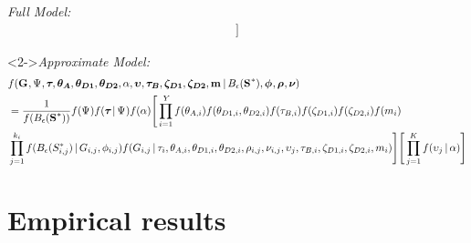 \begin{frame}[b]
\begin{onlyenv}
\begin{block}{\it Full Model:}
{\begin{equation*}
\begin{split}
        \Bigg]
        \label{eq:fullmodel}
        \end{split}
    \end{equation*}
    }
    \end{block}
    \end{onlyenv}
    \begin{block}<2->{\it Approximate Model:}
    {\tiny
    \begin{equation*}
        \begin{split}
        & f(\geneTreeVector,
        \numt{},
        \divtvector, \ancestralThetaVector,
        \descendantThetaVector{1}, \descendantThetaVector{2},
        \locusRateHetShapeParameter,
        \locusMutationRateScalarVector,
        \bottleTimeVector, \bottleScalarVector{1},
        \bottleScalarVector{2},
        \migrationRateVector \given
        \euclideanSpace{\ssVectorObs}, \hkyModelVector, \ploidyScalarVector,
        \mutationRateScalarConstantVector) \\
        & = \frac{1}{f(\euclideanSpace{\ssVectorObs})}
        f(\numt{}) f(\divtvector{} \given \numt{})
        f(\locusRateHetShapeParameter)
        \Bigg[
        \prod_{i=1}^{\npairs{}}
        f(\ancestralTheta{i})
        f(\descendantTheta{1}{i}, \descendantTheta{2}{i})
        f(\bottleTime{i})
        f(\bottleScalar{1}{i}) f(\bottleScalar{2}{i})
        f(\migrationRate{i}) \\
        &
        \prod_{j=1}^{\nloci{i}}
        f(\euclideanSpace{\alignmentSSObs{i}{j}} \given
        \geneTree{i}{j}, \hkyModel{i}{j})
        f(\geneTree{i}{j} \given
        \divt{i},
        \ancestralTheta{i}, \descendantTheta{1}{i}, \descendantTheta{2}{i},
        \ploidyScalar{i}{j}, \mutationRateScalarConstant{i}{j},
        \locusMutationRateScalar{j},
        \bottleTime{i}, \bottleScalar{1}{i}, \bottleScalar{2}{i},
        \migrationRate{i})
        \Bigg]
        \Bigg[
        \prod_{j=1}^{\nlociTotal}
        f(\locusMutationRateScalar{j} \given \locusRateHetShapeParameter)
        \Bigg]
        \label{eq:approxmodel}
        \end{split}
    \end{equation*}
    }
    \end{block}
\end{frame}

\section{Empirical results}

